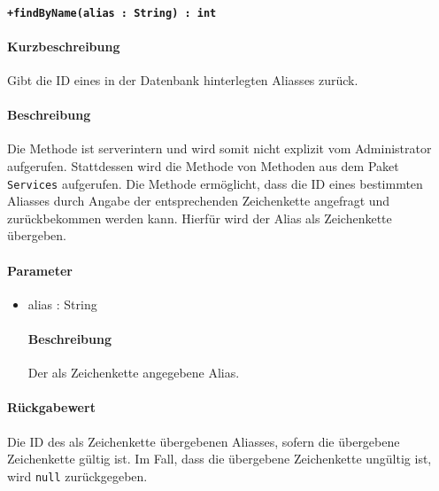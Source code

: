 \paragraph*{\texttt{+findByName(alias : String) : int}}%
\paragraph*{Kurzbeschreibung}
Gibt die ID eines in der Datenbank hinterlegten Aliasses zurück.
\paragraph*{Beschreibung}
Die Methode ist serverintern und wird somit nicht explizit vom Administrator aufgerufen.
Stattdessen wird die Methode von Methoden aus dem Paket \texttt{Services} aufgerufen.
Die Methode ermöglicht, dass die ID eines bestimmten Aliasses durch Angabe der entsprechenden Zeichenkette angefragt und zurückbekommen werden kann.
Hierfür wird der Alias als Zeichenkette übergeben.
\paragraph*{Parameter}
\begin{itemize}
    \item alias : String
    		\paragraph*{Beschreibung}
    		Der als Zeichenkette angegebene Alias.
\end{itemize}
\paragraph*{Rückgabewert}
Die ID des als Zeichenkette übergebenen Aliasses, sofern die übergebene Zeichenkette gültig ist.
Im Fall, dass die übergebene Zeichenkette ungültig ist, wird \texttt{null} zurückgegeben.
